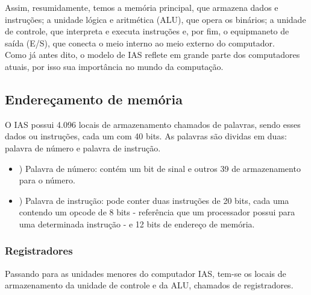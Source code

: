 \documentclass{article}
\begin{document}
Assim, resumidamente, temos a memória principal, que armazena dados e
instruções; a unidade lógica e aritmética (ALU), que opera os binários; a
unidade de controle, que interpreta e executa instruções e, por fim, o
equipmaneto de saída (E/S), que conecta o meio interno ao meio externo do
computador. \\

Como já antes dito, o modelo de IAS reflete em grande parte dos computadores atuais, por isso sua importância no mundo da computação.

\subsection{Endereçamento de memória}
O IAS possui 4.096 locais de armazenamento chamados de palavras, sendo esses dados ou instruções, cada um com 40 bits. As palavras são dividas em duas: palavra de número e palavra de instrução. \\

\begin{itemize}
	\item{}) Palavra de número: contém um bit de sinal e outros 39 de armazenamento para o número. \\
	\item{}) Palavra de instrução: pode conter duas instruções de 20 bits, cada uma contendo um opcode de 8 bits - referência que um processador possui para uma determinada instrução - e 12 bits de endereço de memória.
\end{itemize}


\subsubsection{Registradores}
Passando para as unidades menores do computador IAS, tem-se os locais de armazenamento da unidade de controle e da ALU, chamados de registradores.
\end{document}
